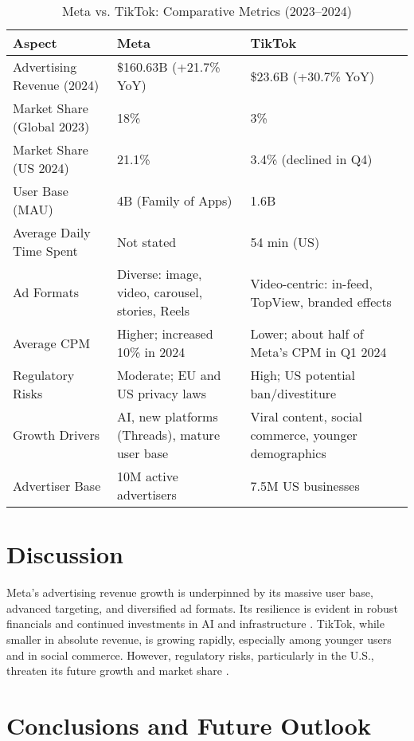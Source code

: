 \documentclass{article}
\begin{document}
\begin{table}[ht]
\centering
\caption{Meta vs. TikTok: Comparative Metrics (2023--2024)}
\label{tab:comparative}
\begin{tabularx}{\textwidth}{l X X}
\toprule
Aspect & Meta & TikTok \\
\midrule
Advertising Revenue (2024) & \$160.63B (+21.7\% YoY) & \$23.6B (+30.7\% YoY) \\
Market Share (Global 2023) & 18\% & 3\% \\
Market Share (US 2024) & 21.1\% & 3.4\% (declined in Q4) \\
User Base (MAU) & 4B (Family of Apps) & 1.6B \\
Average Daily Time Spent & Not stated & 54 min (US) \\
Ad Formats & Diverse: image, video, carousel, stories, Reels & Video-centric: in-feed, TopView, branded effects \\
Average CPM & Higher; increased 10\% in 2024 & Lower; about half of Meta's CPM in Q1 2024 \\
Regulatory Risks & Moderate; EU and US privacy laws & High; US potential ban/divestiture \\
Growth Drivers & AI, new platforms (Threads), mature user base & Viral content, social commerce, younger demographics \\
Advertiser Base & 10M active advertisers & 7.5M US businesses \\
\bottomrule
\end{tabularx}
\end{table}

\section{Discussion}

Meta's advertising revenue growth is underpinned by its massive user base, advanced targeting, and diversified ad formats. Its resilience is evident in robust financials and continued investments in AI and infrastructure \cite{meta_oberlo,meta_ycharts,meta_q4_2024}. TikTok, while smaller in absolute revenue, is growing rapidly, especially among younger users and in social commerce. However, regulatory risks, particularly in the U.S., threaten its future growth and market share \cite{tiktok_oberlo,tiktok_sendshort,cb_tiktok_ban}.

\section{Conclusions and Future Outlook}
\end{document}
